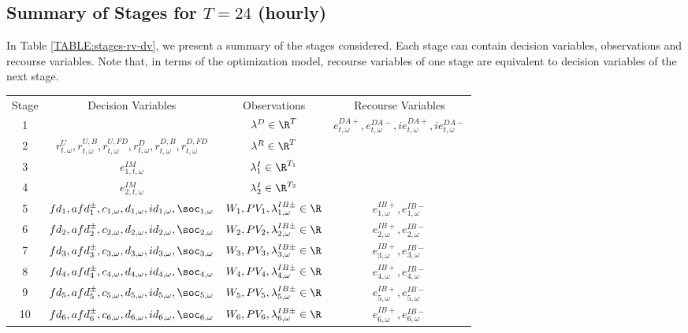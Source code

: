 \subsection{\texorpdfstring{Summary of Stages for $T = 24$ (hourly)}{Summary of Stages for T = 24 (hourly)}}

In Table \ref{TABLE:stages-rv-dv}, we present a summary of the stages considered. Each stage can contain decision variables, observations and recourse variables. Note that, in terms of the optimization model, recourse variables of one stage are equivalent to decision variables of the next stage.

\begin{table}[H]
\begin{tabular}{c c c c}
	Stage & Decision Variables & Observations & Recourse Variables \\
	1 & & $\lambda^D \in \R^{T}$& $e^{DA+}_{t, \omega}, e^{DA-}_{t, \omega}, ie^{DA+}_{t, \omega}, ie^{DA-}_{t, \omega}$\\
	2 & $r^U_{t, \omega}, r^{U, B}_{t, \omega}, r^{U, FD}_{t, \omega}, r^{D}_{t, \omega}, r^{D, B}_{t, \omega}, r^{D, FD}_{t, \omega}$ & $\lambda^R \in \R^{T}$& \\
	3 & $e^{IM}_{1, t, \omega}$ & $\lambda^I_1 \in \R^{T_1}$&  \\
	4 & $e^{IM}_{2, t, \omega}$ & $\lambda^I_2 \in \R^{T_2}$&  \\
	5 & $fd_1, afd^{\pm}_1, c_{1, \omega}, d_{1, \omega}, id_{1, \omega}, \soc_{1, \omega}$ & $W_1, PV_1, \lambda^{IB\pm}_{1, \omega} \in \R$ & $e^{IB+}_{1, \omega}, e^{IB-}_{1, \omega}$\\
	6 & $fd_2, afd^{\pm}_2, c_{2, \omega}, d_{2, \omega}, id_{2, \omega}, \soc_{2, \omega}$ & $W_2, PV_2, \lambda^{IB\pm}_{2, \omega} \in \R$ & $e^{IB+}_{2, \omega}, e^{IB-}_{2, \omega}$\\
	7& $fd_3, afd^{\pm}_3, c_{3, \omega}, d_{3, \omega}, id_{3, \omega}, \soc_{3, \omega}$  & $W_3, PV_3, \lambda^{IB\pm}_{3, \omega} \in \R$ & $e^{IB+}_{3, \omega}, e^{IB-}_{3, \omega}$\\
	8& $fd_4, afd^{\pm}_4, c_{4, \omega}, d_{4, \omega}, id_{4, \omega}, \soc_{4, \omega}$ & $W_4, PV_4, \lambda^{IB\pm}_{4, \omega} \in \R$ & $e^{IB+}_{4, \omega}, e^{IB-}_{4, \omega}$\\
	9& $fd_5, afd^{\pm}_5, c_{5, \omega}, d_{5, \omega}, id_{5, \omega}, \soc_{5, \omega}$ & $W_5, PV_5, \lambda^{IB\pm}_{5, \omega} \in \R$ & $e^{IB+}_{5, \omega}, e^{IB-}_{5, \omega}$\\
	10& $fd_6, afd^{\pm}_6, c_{6, \omega}, d_{6, \omega}, id_{6, \omega}, \soc_{6, \omega}$ & $W_6, PV_6, \lambda^{IB\pm}_{6, \omega} \in \R$ & $e^{IB+}_{6, \omega}, e^{IB-}_{6, \omega}$\\

\end{tabular}
\end{table}
